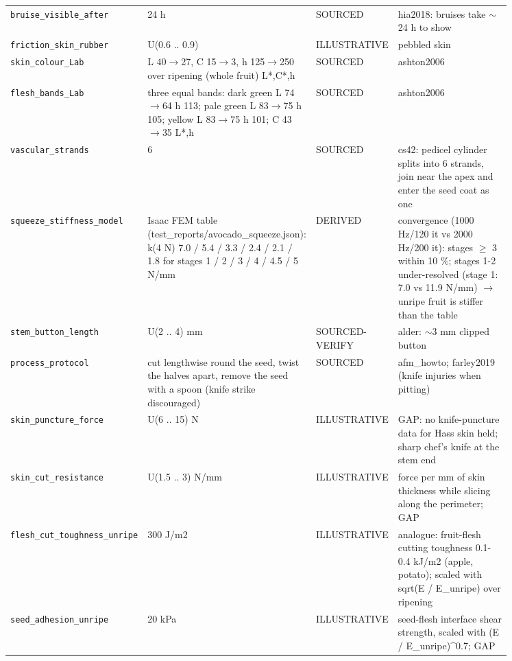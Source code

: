 \documentclass[10.5pt,a4paper]{article}
\begin{document}
{\begin{longtable}{@{}p{0.2\linewidth}p{0.27\linewidth}p{0.12\linewidth}p{0.26\linewidth}@{}}
\texttt{bruise\_\allowbreak{}visible\_\allowbreak{}after} & 24 h & SOURCED & hia2018: bruises take $\sim$24 h to show \\
\texttt{friction\_\allowbreak{}skin\_\allowbreak{}rubber} & U(0.6 .. 0.9) & ILLUSTRATIVE & pebbled skin \\
\texttt{skin\_\allowbreak{}colour\_\allowbreak{}Lab} & L 40$\to$27, C 15$\to$3, h 125$\to$250 over ripening (whole fruit) L*,C*,h & SOURCED & ashton2006 \\
\texttt{flesh\_\allowbreak{}bands\_\allowbreak{}Lab} & three equal bands: dark green L 74$\to$64 h 113; pale green L 83$\to$75 h 105; yellow L 83$\to$75 h 101; C 43$\to$35 L*,h & SOURCED & ashton2006 \\
\texttt{vascular\_\allowbreak{}strands} & 6 & SOURCED & cs42: pedicel cylinder splits into 6 strands, join near the apex and enter the seed coat as one \\
\texttt{squeeze\_\allowbreak{}stiffness\_\allowbreak{}model} & Isaac FEM table (test\_reports/avocado\_squeeze.json): k(4 N) 7.0 / 5.4 / 3.3 / 2.4 / 2.1 / 1.8 for stages 1 / 2 / 3 / 4 / 4.5 / 5 N/mm & DERIVED & convergence (1000 Hz/120 it vs 2000 Hz/200 it): stages $\ge$ 3 within 10 \%; stages 1-2 under-resolved (stage 1: 7.0 vs 11.9 N/mm) $\to$ unripe fruit is stiffer than the table \\
\texttt{stem\_\allowbreak{}button\_\allowbreak{}length} & U(2 .. 4) mm & SOURCED-VERIFY & alder: $\sim$3 mm clipped button \\
\texttt{process\_\allowbreak{}protocol} & cut lengthwise round the seed, twist the halves apart, remove the seed with a spoon (knife strike discouraged) & SOURCED & afm\_howto; farley2019 (knife injuries when pitting) \\
\texttt{skin\_\allowbreak{}puncture\_\allowbreak{}force} & U(6 .. 15) N & ILLUSTRATIVE & GAP: no knife-puncture data for Hass skin held; sharp chef's knife at the stem end \\
\texttt{skin\_\allowbreak{}cut\_\allowbreak{}resistance} & U(1.5 .. 3) N/mm & ILLUSTRATIVE & force per mm of skin thickness while slicing along the perimeter; GAP \\
\texttt{flesh\_\allowbreak{}cut\_\allowbreak{}toughness\_\allowbreak{}unripe} & 300 J/m2 & ILLUSTRATIVE & analogue: fruit-flesh cutting toughness 0.1-0.4 kJ/m2 (apple, potato); scaled with sqrt(E / E\_unripe) over ripening \\
\texttt{seed\_\allowbreak{}adhesion\_\allowbreak{}unripe} & 20 kPa & ILLUSTRATIVE & seed-flesh interface shear strength, scaled with (E / E\_unripe)\^{}0.7; GAP \\

\end{longtable}}
\end{document}
